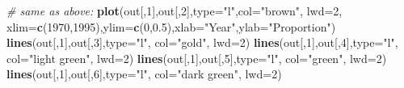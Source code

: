 \documentclass[
]{article}
\newenvironment{Shaded}{\begin{snugshade}}{\end{snugshade}}
\newcommand{\AttributeTok}[1]{\textcolor[rgb]{0.13,0.29,0.53}{#1}}
\newcommand{\CommentTok}[1]{\textcolor[rgb]{0.56,0.35,0.01}{\textit{#1}}}
\newcommand{\DecValTok}[1]{\textcolor[rgb]{0.00,0.00,0.81}{#1}}
\newcommand{\FloatTok}[1]{\textcolor[rgb]{0.00,0.00,0.81}{#1}}
\newcommand{\FunctionTok}[1]{\textcolor[rgb]{0.13,0.29,0.53}{\textbf{#1}}}
\newcommand{\NormalTok}[1]{#1}
\newcommand{\StringTok}[1]{\textcolor[rgb]{0.31,0.60,0.02}{#1}}
\begin{document}
\begin{Shaded}
\begin{Highlighting}[]
\CommentTok{\# same as above:}
\FunctionTok{plot}\NormalTok{(out[,}\DecValTok{1}\NormalTok{],out[,}\DecValTok{2}\NormalTok{],}\AttributeTok{type=}\StringTok{"l"}\NormalTok{,}\AttributeTok{col=}\StringTok{"brown"}\NormalTok{, }\AttributeTok{lwd=}\DecValTok{2}\NormalTok{, }\AttributeTok{xlim=}\FunctionTok{c}\NormalTok{(}\DecValTok{1970}\NormalTok{,}\DecValTok{1995}\NormalTok{),}\AttributeTok{ylim=}\FunctionTok{c}\NormalTok{(}\DecValTok{0}\NormalTok{,}\FloatTok{0.5}\NormalTok{),}\AttributeTok{xlab=}\StringTok{"Year"}\NormalTok{,}\AttributeTok{ylab=}\StringTok{"Proportion"}\NormalTok{)}
\FunctionTok{lines}\NormalTok{(out[,}\DecValTok{1}\NormalTok{],out[,}\DecValTok{3}\NormalTok{],}\AttributeTok{type=}\StringTok{"l"}\NormalTok{, }\AttributeTok{col=}\StringTok{"gold"}\NormalTok{, }\AttributeTok{lwd=}\DecValTok{2}\NormalTok{)}
\FunctionTok{lines}\NormalTok{(out[,}\DecValTok{1}\NormalTok{],out[,}\DecValTok{4}\NormalTok{],}\AttributeTok{type=}\StringTok{"l"}\NormalTok{, }\AttributeTok{col=}\StringTok{"light green"}\NormalTok{, }\AttributeTok{lwd=}\DecValTok{2}\NormalTok{)}
\FunctionTok{lines}\NormalTok{(out[,}\DecValTok{1}\NormalTok{],out[,}\DecValTok{5}\NormalTok{],}\AttributeTok{type=}\StringTok{"l"}\NormalTok{, }\AttributeTok{col=}\StringTok{"green"}\NormalTok{, }\AttributeTok{lwd=}\DecValTok{2}\NormalTok{)}
\FunctionTok{lines}\NormalTok{(out[,}\DecValTok{1}\NormalTok{],out[,}\DecValTok{6}\NormalTok{],}\AttributeTok{type=}\StringTok{"l"}\NormalTok{, }\AttributeTok{col=}\StringTok{"dark green"}\NormalTok{, }\AttributeTok{lwd=}\DecValTok{2}\NormalTok{)}


\end{Highlighting}
\end{Shaded}
\end{document}
